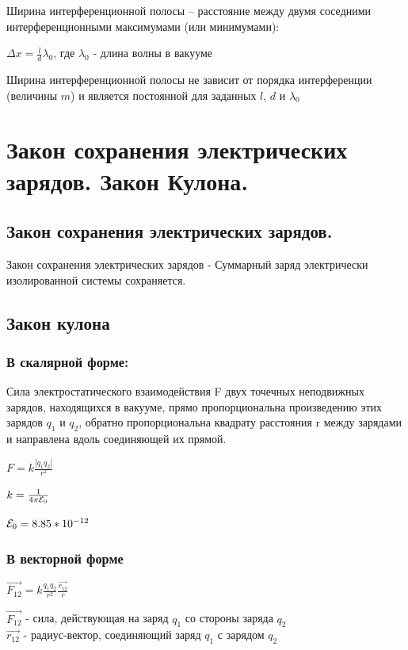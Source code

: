 \documentclass[12pt]{report}
\begin{document}
Ширина интерференционной полосы – расстояние между двумя соседними интерференционными максимумами (или минимумами):

\begin{center}
    $\Delta x = \frac{l}{d} \lambda_0$, где  $\lambda_0$ - длина волны в вакууме
\end{center}

Ширина интерференционной полосы не зависит от порядка интерференции (величины $m$) и является постоянной для заданных $l$, $d$ и $\lambda_0$

\section{Закон сохранения электрических зарядов. Закон Кулона.}
\subsection{Закон сохранения электрических зарядов.}
Закон сохранения электрических зарядов - Суммарный заряд электрически
изолированной системы сохраняется.
\subsection{Закон кулона}
\subsubsection{В скалярной форме:}
Сила электростатического взаимодействия F
двух точечных неподвижных зарядов,
находящихся в вакууме, прямо
пропорциональна произведению этих
зарядов $q_1$ и $q_2$, обратно пропорциональна
квадрату расстояния r между зарядами и
направлена вдоль соединяющей их прямой.
\begin{center}
    $F = k \frac{|q_1 q_2|}{r^2}$
\end{center}
\begin{center}
    $k = \frac{1}{4 \pi \varE_0}$
\end{center}
\begin{center}
    $\varE_0 = 8.85 * 10^{-12}$
\end{center}
\subsubsection{В векторной форме}
\begin{center}
    $\vec{F _{12}} = k \frac{q_1 q_2}{r^2}\frac{\overrightarrow{r_{12}}}{r}$
\end{center}
$\vec{F _{12}}$ -  сила, действующая на заряд $q_1$ со стороны заряда $q_2$\\
$\overrightarrow{r _{12}}$ -  радиус-вектор, соединяющий заряд $q_1$ с зарядом $q_2$
\end{document}
